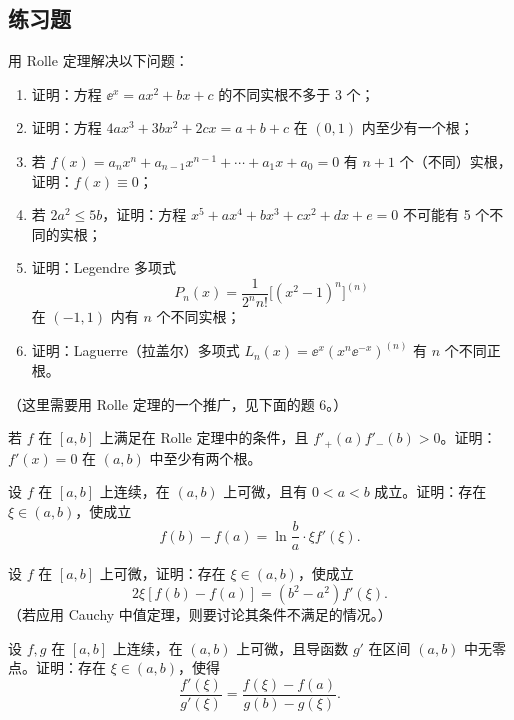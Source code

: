 \subsection{练习题}

\begin{xexercise}[1]
用 Rolle 定理解决以下问题：
\begin{enumerate}[label=(\arabic*)]
  \item 证明：方程 $\ee^x=ax^2+bx+c$ 的不同实根不多于 3 个；
  \item 证明：方程 $4ax^3+3bx^2+2cx=a+b+c$ 在 $(0,1)$ 内至少有一个根；
  \item 若 $f(x)=a_nx^n+a_{n-1}x^{n-1}+\cdots+a_1x+a_0=0$ 有 $n+1$ 个（不同）实根，证明：$f(x)\equiv0$；
  \item 若 $2a^2\leqslant5b$，证明：方程 $x^5+ax^4+bx^3+cx^2+dx+e=0$ 不可能有 5 个不同的实根；
  \item 证明：Legendre 多项式
  \[
    P_n(x)=\frac{1}{2^n n!}\bigl[(x^2-1)^n\bigr]^{(n)}
  \]
  在 $(-1,1)$ 内有 $n$ 个不同实根；
  \item 证明：Laguerre（拉盖尔）多项式 $L_n(x)=\ee^x(x^n\ee^{-x})^{(n)}$ 有 $n$ 个不同正根。
\end{enumerate}
（这里需要用 Rolle 定理的一个推广，见下面的题 6。）
\end{xexercise}

\begin{xexercise}[2]
若 $f$ 在 $[a,b]$ 上满足在 Rolle 定理中的条件，且 $f'_+(a)f'_-(b)>0$。证明：$f'(x)=0$ 在 $(a,b)$ 中至少有两个根。
\end{xexercise}

\begin{xexercise}[3]
设 $f$ 在 $[a,b]$ 上连续，在 $(a,b)$ 上可微，且有 $0<a<b$ 成立。证明：存在 $\xi\in(a,b)$，使成立
\[
  f(b)-f(a)=\ln\frac{b}{a}\cdot\xi f'(\xi).
\]
\end{xexercise}

\begin{xexercise}[4]
设 $f$ 在 $[a,b]$ 上可微，证明：存在 $\xi\in(a,b)$，使成立
\[
  2\xi[f(b)-f(a)]=(b^2-a^2)f'(\xi).
\]
（若应用 Cauchy 中值定理，则要讨论其条件不满足的情况。）
\end{xexercise}

\begin{xexercise}[5]
设 $f,g$ 在 $[a,b]$ 上连续，在 $(a,b)$ 上可微，且导函数 $g'$ 在区间 $(a,b)$ 中无零点。证明：存在 $\xi\in(a,b)$，使得
\[
  \frac{f'(\xi)}{g'(\xi)}=\frac{f(\xi)-f(a)}{g(b)-g(\xi)}.
\]
\end{xexercise}

